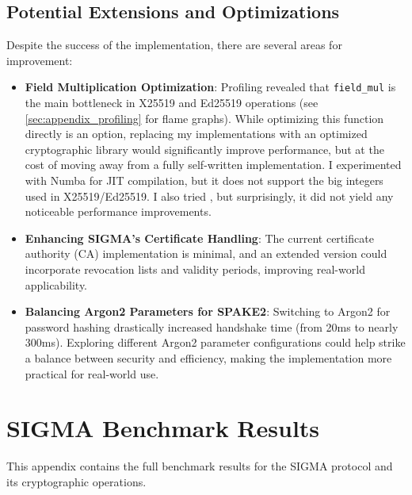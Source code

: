 \documentclass[twoside,a4paper,12pt]{article}
\begin{document}
\subsection{Potential Extensions and Optimizations}

Despite the success of the implementation, there are several areas for improvement:

\begin{itemize}
    \item \textbf{Field Multiplication Optimization}: Profiling revealed that \texttt{field\_mul} is the main bottleneck in X25519 and Ed25519 operations (see \autoref{sec:appendix_profiling} for flame graphs). While optimizing this function directly is an option, replacing my implementations with an optimized cryptographic library would significantly improve performance, but at the cost of moving away from a fully self-written implementation. I experimented with Numba \cite{lam2015numba} for JIT compilation, but it does not support the big integers used in X25519/Ed25519. I also tried \cite{gmpy2}, but surprisingly, it did not yield any noticeable performance improvements.
    
    \item \textbf{Enhancing SIGMA's Certificate Handling}: The current certificate authority (CA) implementation is minimal, and an extended version could incorporate revocation lists and validity periods, improving real-world applicability.

    \item \textbf{Balancing Argon2 Parameters for SPAKE2}: Switching to Argon2 for password hashing drastically increased handshake time (from 20ms to nearly 300ms). Exploring different Argon2 parameter configurations could help strike a balance between security and efficiency, making the implementation more practical for real-world use.
\end{itemize}


\newpage
\printbibliography
\newpage

\appendix
\renewcommand{\thesection}{\Alph{section}}
\section{SIGMA Benchmark Results}
\label{sec:appendix_benchmarks_sigma}

This appendix contains the full benchmark results for the SIGMA protocol and its cryptographic operations.
\end{document}
